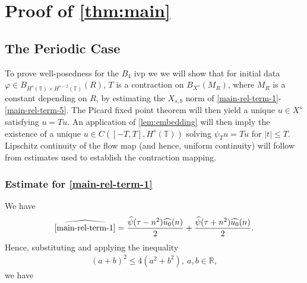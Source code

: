 \documentclass[12pt,reqno]{amsart}
\numberwithin{equation}{section}  %
\numberwithin{figure}{section}
\newcommand{\rr}{\mathbb{R}}
\newcommand{\ci}{\mathbb{T}}
\newcommand{\wh}{\widehat}
\newcommand{\vp}{\varphi}
\theoremstyle{plain}
\theoremstyle{definition}
\theoremstyle{remark}
\begin{document}
\section{Proof of \autoref{thm:main}} 
\label{sec:pf-main}
%
%
\subsection{The Periodic Case} 
\label{ssec:periodic}
To prove well-posedness for the $B_4$ ivp we we will 
show that for initial data $\vp \in B_{H^{s}(\ci) \times H^{s-2}(\ci)}(R)$, $T$ is a contraction on
$B_{X^{s}}(M_{R})$, where $M_{R}$ is a constant depending on $R$, 
by estimating the $X_{s,b}$
norm of \eqref{main-rel-term-1}-\eqref{main-rel-term-5}. The 
Picard fixed point theorem will
then yield a unique $u \in X^{s}$ satisfying $u = Tu$.
An application of
\autoref{lem:embedding} will then imply the existence of a unique
$u \in C([-T, T], H^s(\ci))$ solving $\psi_{T} u = Tu$ for $| t | \le T$.
Lipschitz continuity of the flow map (and hence, uniform
continuity) will follow from estimates used to establish the contraction
mapping. 
%
%
%
%
%
%
%
%
%
\subsubsection{Estimate for \eqref{main-rel-term-1}}
\label{sssec:est-init-term-1}
We have
%
%
\begin{equation*}
  \begin{split}
    \wh{\eqref{main-rel-term-1}}
    = \frac{\wh{\psi}(\tau -
    n^{2})\wh{u_{0}}(n)}{2} + \frac{\wh{\psi}(\tau +
    n^{2})\wh{u_{0}}(n)}{2}.
  \end{split}
\end{equation*}
%
%
Hence, substituting and applying the inequality 
%
%
\begin{equation}
  \label{square-ineq}
\begin{split}
(a + b)^{2} \le 4(a^{2} +
b^{2}),\ a, b \in \rr,
\end{split}
\end{equation}
%
%
we have
\end{document}
